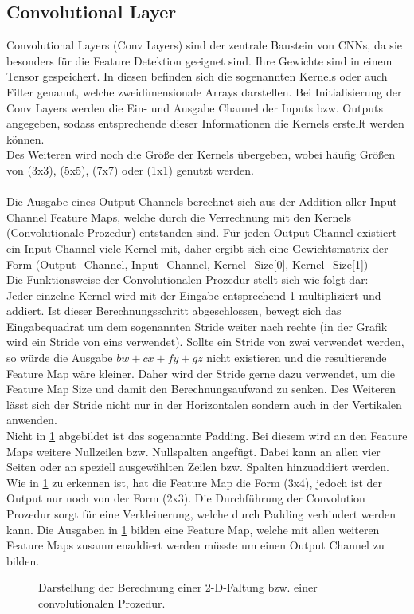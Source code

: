 \subsection{Convolutional Layer} \label{Conv_Layers}
Convolutional Layers (Conv Layers) sind der zentrale Baustein von CNNs, da sie besonders für die Feature Detektion geeignet sind. Ihre Gewichte sind in einem Tensor gespeichert. In diesen befinden sich die sogenannten Kernels oder auch Filter genannt, welche zweidimensionale Arrays darstellen. Bei Initialisierung der Conv Layers werden die Ein- und Ausgabe Channel der Inputs bzw. Outputs angegeben, sodass entsprechende dieser Informationen die Kernels erstellt werden können.\\
Des Weiteren wird noch die Größe der Kernels übergeben, wobei häufig Größen von (3x3), (5x5), (7x7) oder (1x1) genutzt werden.\\
\\Die Ausgabe eines Output Channels berechnet sich aus der Addition aller Input Channel Feature Maps, welche durch die Verrechnung mit den Kernels (Convolutionale Prozedur) entstanden sind. Für jeden Output Channel existiert ein Input Channel viele Kernel mit, daher ergibt sich eine Gewichtsmatrix der Form (Output\_Channel, Input\_Channel, Kernel\_Size[0], Kernel\_Size[1]) \cite[S. 369 ff.]{DL}\\
Die Funktionsweise der Convolutionalen Prozedur stellt sich wie folgt dar:\\
Jeder einzelne Kernel wird mit der Eingabe entsprechend \ref{fig:Conv2d} multipliziert und addiert. Ist dieser Berechnungsschritt abgeschlossen, bewegt sich das Eingabequadrat um dem sogenannten Stride weiter nach rechte (in der Grafik wird ein Stride von eins verwendet). Sollte ein Stride von zwei verwendet werden, so würde die Ausgabe $bw + cx + fy + gz$ nicht existieren und die resultierende Feature Map wäre kleiner. Daher wird der Stride gerne dazu verwendet, um die Feature Map Size und damit den Berechnungsaufwand zu senken. Des Weiteren lässt sich der Stride nicht nur in der Horizontalen sondern auch in der Vertikalen anwenden.\\
Nicht in \ref{fig:Conv2d} abgebildet ist das sogenannte Padding. Bei diesem wird an den Feature Maps weitere Nullzeilen bzw. Nullspalten angefügt. Dabei kann an allen vier Seiten oder an speziell ausgewählten Zeilen bzw. Spalten hinzuaddiert werden. Wie in \ref{fig:Conv2d} zu erkennen ist, hat die Feature Map die Form (3x4), jedoch ist der Output nur noch von der Form (2x3). Die Durchführung der Convolution Prozedur sorgt für eine Verkleinerung, welche durch Padding verhindert werden kann. \cite[S. 369 ff.]{DL}
Die Ausgaben in \ref{fig:Conv2d} bilden eine Feature Map, welche mit allen weiteren Feature Maps zusammenaddiert werden müsste um einen Output Channel zu bilden.
\begin{figure}[H]
	\centering
	\def\svgscale{0.95}
	
	\caption[Darstellung Convolutional Computation]{Darstellung der Berechnung einer 2-D-Faltung bzw. einer convolutionalen Prozedur. \cite[S. 373]{DL}}
	\label{fig:Conv2d}
\end{figure}

